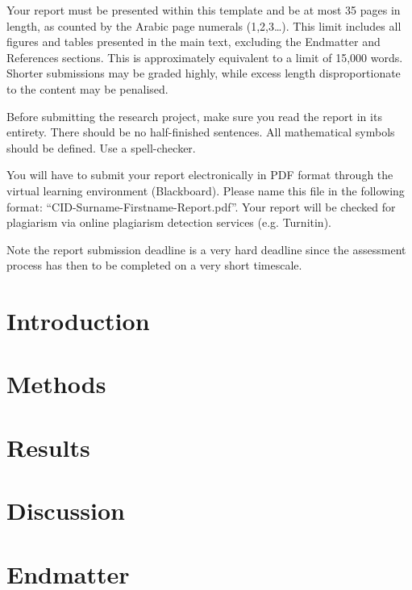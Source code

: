\documentclass{statsmsc}
\begin{document}
Your report must be presented within this template and be at most 35 pages in length, as counted by the Arabic page numerals (1,2,3…). This limit includes all figures and tables presented in the main text, excluding the Endmatter and References sections. This is approximately equivalent to a limit of 15,000 words. Shorter submissions may be graded highly, while excess length disproportionate to the content may be penalised.


Before submitting the research project, make sure you read the report in its entirety. There should be no half-finished sentences. All mathematical symbols should be defined. Use a spell-checker.

You will have to submit your report electronically in PDF format through the virtual learning environment (Blackboard). Please name this file in the following format: “CID-Surname-Firstname-Report.pdf”. Your report will be checked for plagiarism via online plagiarism detection services (e.g. Turnitin). 

Note the report submission deadline is a very hard deadline since the assessment process has then to be completed on a very short timescale.
\section{Introduction}

\section{Methods}\label{sec:methods}

\section{Results}


\section{Discussion}



\section{Endmatter} \label{sec:endmatter}


%
%
%
%
%
%
\end{document}
